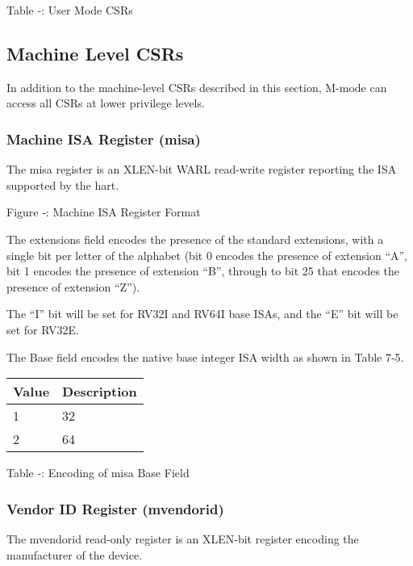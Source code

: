 Table ‑: User Mode CSRs

\protect\hypertarget{_Toc326677757}{}{\protect\hypertarget{_Toc327108346}{}{}}

\subsection{Machine Level CSRs}\label{machine-level-csrs}

In addition to the machine-level CSRs described in this section, M-mode
can access all CSRs at lower privilege levels.

\subsubsection{Machine ISA Register
(misa)}\label{machine-isa-register-misa}

The misa register is an XLEN-bit WARL read-write register reporting the
ISA supported by the hart.

\missingfigure{}

Figure ‑: Machine ISA Register Format

The extensions field encodes the presence of the standard extensions,
with a single bit per letter of the alphabet (bit 0 encodes the presence
of extension ``A'', bit 1 encodes the presence of extension ``B'',
through to bit 25 that encodes the presence of extension ``Z'').

The ``I'' bit will be set for RV32I and RV64I base ISAs, and the ``E''
bit will be set for RV32E.

The Base field encodes the native base integer ISA width as shown in
Table 7‑5.

\begin{longtable}[]{@{}ll@{}}
\toprule
Value & Description\tabularnewline
\midrule
\endhead
1 & 32\tabularnewline
2 & 64\tabularnewline
\bottomrule
\end{longtable}

\protect\hypertarget{_Ref367027661}{}{}Table ‑: Encoding of misa Base
Field

\subsubsection{Vendor ID Register
(mvendorid)}\label{vendor-id-register-mvendorid}

The mvendorid read-only register is an XLEN-bit register encoding the
manufacturer of the device.

\missingfigure{}

